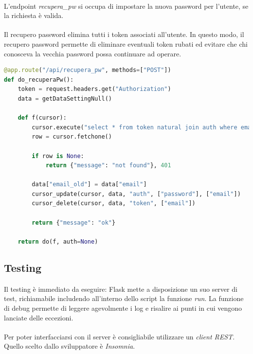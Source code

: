 \documentclass[11pt,a4paper,english]{article}
\begin{document}
\paragraph{} L'endpoint \emph{recupera\_pw} si occupa di impostare la nuova password per l'utente, se la richiesta è valida.

\paragraph{} Il recupero password elimina tutti i token associati all'utente. In questo modo, il recupero password permette di eliminare eventuali token rubati ed evitare che chi conosceva la vecchia password possa continuare ad operare. 

\begin{lstlisting}[language=Python, caption=POST recupera\_pw]
@app.route("/api/recupera_pw", methods=["POST"])
def do_recuperaPw():
    token = request.headers.get("Authorization")
    data = getDataSettingNull()

    def f(cursor):
        cursor.execute("select * from token natural join auth where email=%s and token=%s", (data["email"], token))
        row = cursor.fetchone()

        if row is None:
            return {"message": "not found"}, 401

        data["email_old"] = data["email"]
        cursor_update(cursor, data, "auth", ["password"], ["email"])
        cursor_delete(cursor, data, "token", ["email"])

        return {"message": "ok"}

    return do(f, auth=None)
\end{lstlisting}


\subsection{Testing}

\paragraph{} Il testing è immediato da eseguire: Flask mette a disposizione un suo server di test, richiamabile includendo all'interno dello script la funzione \emph{run}. La funzione di debug permette di leggere agevolmente i log e risalire ai punti in cui vengono lanciate delle eccezioni.

\paragraph{} Per poter interfacciarsi con il server è consigliabile utilizzare un \emph{client REST}. Quello scelto dallo sviluppatore è \emph{Insomnia}.
\end{document}
